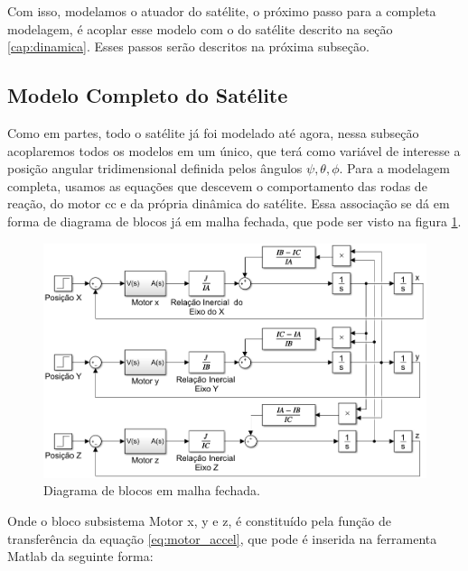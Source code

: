 Com isso, modelamos o atuador do satélite, o próximo passo para a completa modelagem, é acoplar esse modelo com o do satélite descrito na seção \ref{cap:dinamica}. Esses passos serão descritos na próxima subseção.



\subsection{Modelo Completo do Satélite}

Como em partes, todo o satélite já foi modelado até agora, nessa subseção acoplaremos todos os modelos em um único, que terá como variável de interesse a posição angular tridimensional definida pelos ângulos $\psi, \theta, \phi$. Para a modelagem completa, usamos as equações que descevem o comportamento das rodas de reação, do motor cc e da própria dinâmica do satélite. Essa associação se dá em forma de diagrama de blocos já em malha fechada, que pode ser visto na figura \ref{fig:simulink_modelo_completo_aberto}.

\begin{figure}[H]
  \caption{Diagrama de blocos em malha fechada.}
  \begin{center}
      \includegraphics[scale=.6]{metodologia/img/simulink_modelo_completo_aberto}
  \end{center}
  \label{fig:simulink_modelo_completo_aberto}
\end{figure}

Onde o bloco subsistema Motor x, y e z, é constituído pela função de transferência da equação \ref{eq:motor_accel}, que pode é inserida na ferramenta Matlab da seguinte forma:

